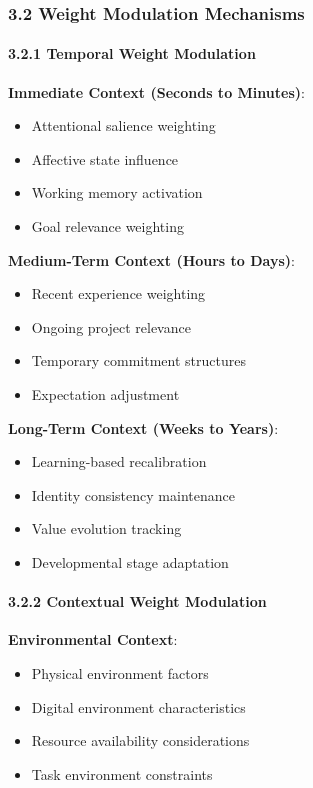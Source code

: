 \documentclass[
]{article}
\providecommand{\tightlist}{%
  \setlength{\itemsep}{0pt}\setlength{\parskip}{0pt}}
\begin{document}
\subsubsection{3.2 Weight Modulation
Mechanisms}\label{weight-modulation-mechanisms}

\paragraph{3.2.1 Temporal Weight
Modulation}\label{temporal-weight-modulation}

\textbf{Immediate Context (Seconds to Minutes)}:

\begin{itemize}
\tightlist
\item
  Attentional salience weighting
\item
  Affective state influence
\item
  Working memory activation
\item
  Goal relevance weighting
\end{itemize}

\textbf{Medium-Term Context (Hours to Days)}:

\begin{itemize}
\tightlist
\item
  Recent experience weighting
\item
  Ongoing project relevance
\item
  Temporary commitment structures
\item
  Expectation adjustment
\end{itemize}

\textbf{Long-Term Context (Weeks to Years)}:

\begin{itemize}
\tightlist
\item
  Learning-based recalibration
\item
  Identity consistency maintenance
\item
  Value evolution tracking
\item
  Developmental stage adaptation
\end{itemize}

\paragraph{3.2.2 Contextual Weight
Modulation}\label{contextual-weight-modulation}

\textbf{Environmental Context}:

\begin{itemize}
\tightlist
\item
  Physical environment factors
\item
  Digital environment characteristics
\item
  Resource availability considerations
\item
  Task environment constraints
\end{itemize}
\end{document}
